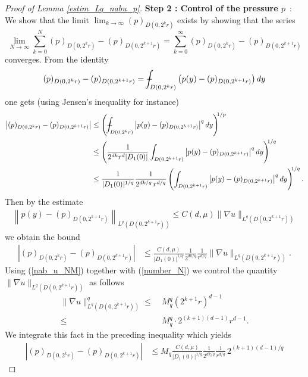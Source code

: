 \documentclass[11pt, reqno]{amsart}
\theoremstyle{definition}
\theoremstyle{remark}
\numberwithin{equation}{section}
\def\Xint#1{\mathchoice
	{\XXint\displaystyle\textstyle{#1}}%
	{\XXint\textstyle\scriptstyle{#1}}%
	{\XXint\scriptstyle\scriptscriptstyle{#1}}%
	{\XXint\scriptscriptstyle\scriptscriptstyle{#1}}%
	\!\int}
\def\XXint#1#2#3{{\setbox0=\hbox{$#1{#2#3}{\int}$ }
		\vcenter{\hbox{$#2#3$ }}\kern-.6\wd0}}
\def\dashint{\Xint-}        %
\begin{document}
\begin{appendices}
\begin{proof}[Proof of \textup{Lemma \ref{estim_Lq_nabu_p}}]
	
	\noindent \textbf{Step 2 : Control of the pressure  $p$}\, : \\
	We show that the limit  $\lim_{k\rightarrow \infty}(p)_{D(0,2^k r)}$  exists by showing that the series $$\lim_{N\rightarrow \infty}\sum^N_{k=0} (p)_{D(0,2^k r)} -  (p)_{D(0,2^{k+1} r)} = \sum^\infty_{k=0} (p)_{D(0,2^k r)} -  (p)_{D(0,2^{k+1} r)}  $$ 
	converges. From the identity 
	\begin{align}
		(p)_{D(0,2^k r)} -  (p)_{D(0,2^{k+1} r)}  	= \dashint_{D(0,2^k r)} \left(  p(y) -  (p)_{D(0,2^{k+1} r)}   \right) dy\nonumber
	\end{align}	one gets (using Jensen's inequality for instance)
	\begin{align}
		\left| (p)_{D(0,2^k r)} -  (p)_{D(0,2^{k+1} r)} \right|
		&\leq  \left( \dashint_{D(0,2^kr)} \left| p(y) -  (p)_{D(0,2^{k+1} r)}     \right|^q dy \right)^{\!\!1/p} \nonumber  \\
		&\leq  \left( \frac{1}{2^{dk}r^d|D_1(0)|} \int_{D(0,2^{k+1} r)} \left| p(y)-  (p)_{D(0,2^{k+1} r)} \right|^q dy  \right)^{\!\!1/q} \nonumber\\
		&\leq \frac{1}{|D_1(0)|^{1/q}} \frac{1}{2^{dk/q}\, r^{d/q}}\left(\int_{D(0,2^{k+1} r)} \left|   p(y)-  (p)_{D(0,2^{k+1} r)}\right|^q dy \right)^{\!\!1/q} .\nonumber
	\end{align}	
	Then by the estimate 
	\begin{align}
		\left\|  p(y)-  (p)_{D(0,2^{k+1} r)} \right\|_{L^q \left({D(0,2^{k+1} r)}  \right)} \leq C(d,\mu) \| \nabla u \|_{L^q\left(D(0,2^{k+1} r) \right)}\nonumber
	\end{align}
	we obtain the bound
	\begin{align}
		\left| (p)_{D(0,2^k r)} -  (p)_{D(0,2^{k+1} r)}    \right|
		&\leq \frac{C(d,\mu)}{|D_1(0)|^{1/q}} \frac{1}{2^{dk/q}} \frac{1}{r^{d/q}}\| \nabla u \|_{L^q\left(D(0,2^{k+1} r) \right)} .\nonumber
	\end{align}
	Using 	(\ref{nab_u_NM}) together with (\ref{number_N})  we control the quantity $\|\nabla u\|_{L^q(D(0,2^{k+1} r) )} $ as follows
	\begin{align*}
		\|\nabla u \|^q_{L^q(D(0,2^{k+1} r) )}
		\leq & \ M^q_q (2^{k+1}r)^{d-1}\\
		\leq & \ M^q_q \cdot 2^{(k+1)(d-1)}r^{d-1}.
	\end{align*}
	We integrate this fact in the preceding inequality which yields
	\begin{align}
		\left|   (p)_{D(0,2^k r)} -  (p)_{D(0,2^{k+1} r)} \right|
		&\leq M_q \frac{C(d,\mu)}{|D_1(0)|^{1/q}} \frac{1}{2^{dk/q}}\frac{1}{r^{d/q}}\,  2^{(k+1)(d-1)/q}

\end{align}
\end{proof}
\end{appendices}
\end{document}
